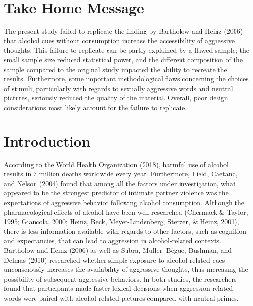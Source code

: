 \documentclass[authordate, serif, review]{jote-article}
\begin{document}
\begin{multicols}{2}
{}
\section*{Take Home Message} \gotoreview
\label{sec:take-home}

\noindent  The present study failed to replicate the finding by Bartholow and Heinz (2006) that alcohol cues without consumption increase the accessibility of aggressive thoughts. This failure to replicate can be partly explained by a flawed sample; the small sample size reduced statistical power, and the different composition of the sample compared to the original study impacted the ability to recreate the results. Furthermore, some important methodological flaws concerning the choices of stimuli, particularly with regards to sexually aggressive words and neutral pictures, seriously reduced the quality of the material. Overall, poor design considerations most likely account for the failure to replicate.

{}
\section*{Introduction} \gotoreview
\label{sec:introduction}

\noindent According to the World Health Organization (2018), harmful use of alcohol results in 3 million deaths worldwide every year. Furthermore, Field, Caetano, and Nelson (2004) found that among all the factors under investigation, what appeared to be the strongest predictor of intimate partner violence was the expectations of aggressive behavior following alcohol consumption. Although the pharmacological effects of alcohol have been well researched (Chermack \& Taylor, 1995; Giancola, 2000; Heinz, Beck, Meyer-Lindenberg, Sterzer, \& Heinz, 2001), there is less information available with regards to other factors, such as cognition and expectancies, that can lead to aggression in alcohol-related contexts. Bartholow and Heinz (2006) as well as Subra, Muller, B\`{e}gue, Bushman, and Delmas (2010) researched whether simple exposure to alcohol-related cues unconsciously increases the availability of aggressive thoughts, thus increasing the possibility of subsequent aggressive behaviors. In both studies, the researchers found that participants made faster lexical decisions when aggression-related words were paired with alcohol-related pictures compared with neutral primes. 


\end{multicols}
\end{document}
